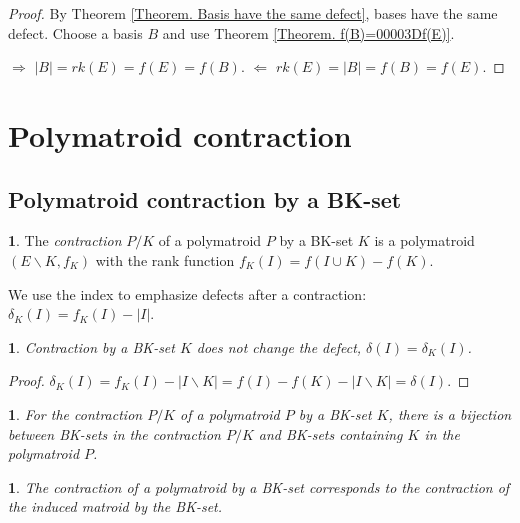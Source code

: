 \documentclass[11pt]{article}
\theoremstyle{plain}
\theoremstyle{definition}
\newtheorem{defn}[thm]{\protect\definitionname}
\theoremstyle{remark}
\theoremstyle{plain}
\newtheorem{lem}[thm]{\protect\lemmaname}
\theoremstyle{plain}
\newtheorem{prop}[thm]{\protect\propositionname}
\theoremstyle{plain}
\newtheorem{cor}[thm]{\protect\corollaryname}
\theoremstyle{definition}
\providecommand{\corollaryname}{Corollary}
\providecommand{\definitionname}{Definition}
\providecommand{\lemmaname}{Lemma}
\providecommand{\propositionname}{Proposition}
\begin{document}
\begin{proof}
By Theorem \ref{Theorem. Basis have the same defect}, bases have
the same defect. Choose a basis $B$ and use Theorem \ref{Theorem. f(B)=00003Df(E)}.

$\boxed{\Rightarrow}$ $|B|=rk(E)=f(E)=f(B)$. $\boxed{\Leftarrow}$
$rk(E)=|B|=f(B)=f(E)$.
\end{proof}

\section{Polymatroid contraction}

\subsection{Polymatroid contraction by a BK-set}
\begin{defn}
The \textit{contraction} $P/K$ of a polymatroid $P$ by a BK-set
$K$ is a polymatroid $(E\backslash K,f_{K})$ with the rank function
$f_{K}(I)=f(I\cup K)-f(K).$
\end{defn}

We use the index to emphasize defects after a contraction: $\delta_{K}(I)=f_{K}(I)-|I|$.
\begin{lem}
\label{Lemma. Contraction by BK does not change defect}Contraction
by a BK-set $K$ does not change the defect, $\delta(I)=\delta_{K}(I)$.
\end{lem}

\begin{proof}
$\delta_{K}(I)=f_{K}(I)-|I\backslash K|=f(I)-f(K)-|I\backslash K|=\delta(I).$
\end{proof}
\begin{cor}
For the contraction $P/K$ of a polymatroid $P$ by a BK-set $K$,
there is a bijection between BK-sets in the contraction $P/K$ and
BK-sets containing $K$ in the polymatroid $P$.
\end{cor}

\begin{prop}
\label{Proposition. Polymatroid contraction by BK}The contraction
of a polymatroid by a BK-set corresponds to the contraction of the
induced matroid by the BK-set.
\end{prop}
\end{document}
